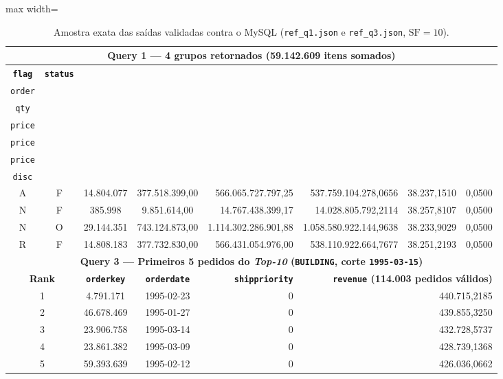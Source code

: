\documentclass[12pt,a4paper]{article}
\begin{document}
\begin{table}[H]
\centering
\small
\setlength{\tabcolsep}{4pt}
\caption{Amostra exata das saídas validadas contra o MySQL (\texttt{ref\_q1.json} e \texttt{ref\_q3.json}, $\text{SF}=10$).}
\label{tab:amostra_gabarito}
\begin{adjustbox}{max width=\textwidth}
\begin{tabular}{ccccrrrr}
\toprule
\multicolumn{8}{c}{\textbf{Query 1 --- 4 grupos retornados (59.142.609 itens somados)}} \\
\midrule
\textbf{\texttt{flag}} & \textbf{\texttt{status}} & \textbf{\shortstack[c]{\texttt{count\_}\\\texttt{order}}} & \textbf{\shortstack[c]{\texttt{sum\_}\\\texttt{qty}}} & \textbf{\shortstack[r]{\texttt{sum\_base\_}\\\texttt{price}}} & \textbf{\shortstack[r]{\texttt{sum\_disc\_}\\\texttt{price}}} & \textbf{\shortstack[r]{\texttt{avg\_}\\\texttt{price}}} & \textbf{\shortstack[r]{\texttt{avg\_}\\\texttt{disc}}} \\
\midrule
A & F & 14.804.077 & 377.518.399,00 & 566.065.727.797,25 & 537.759.104.278,0656 & 38.237,1510 & 0,0500 \\
N & F &    385.998 &   9.851.614,00 &  14.767.438.399,17 &  14.028.805.792,2114 & 38.257,8107 & 0,0500 \\
N & O & 29.144.351 & 743.124.873,00 & 1.114.302.286.901,88 & 1.058.580.922.144,9638 & 38.233,9029 & 0,0500 \\
R & F & 14.808.183 & 377.732.830,00 & 566.431.054.976,00 & 538.110.922.664,7677 & 38.251,2193 & 0,0500 \\
\midrule
\multicolumn{8}{c}{\textbf{Query 3 --- Primeiros 5 pedidos do \textit{Top-10} (\texttt{BUILDING}, corte \texttt{1995-03-15})}} \\
\midrule
\multicolumn{2}{c}{\textbf{Rank}} & \textbf{\texttt{orderkey}} & \textbf{\texttt{orderdate}} & \textbf{\texttt{shippriority}} & \multicolumn{3}{r}{\textbf{\texttt{revenue} (114.003 pedidos válidos)}} \\
\midrule
\multicolumn{2}{c}{1} & 4.791.171  & 1995-02-23 & 0 & \multicolumn{3}{r}{440.715,2185} \\
\multicolumn{2}{c}{2} & 46.678.469 & 1995-01-27 & 0 & \multicolumn{3}{r}{439.855,3250} \\
\multicolumn{2}{c}{3} & 23.906.758 & 1995-03-14 & 0 & \multicolumn{3}{r}{432.728,5737} \\
\multicolumn{2}{c}{4} & 23.861.382 & 1995-03-09 & 0 & \multicolumn{3}{r}{428.739,1368} \\
\multicolumn{2}{c}{5} & 59.393.639 & 1995-02-12 & 0 & \multicolumn{3}{r}{426.036,0662} \\
\bottomrule
\end{tabular}
\end{adjustbox}
\end{table}
\end{document}
